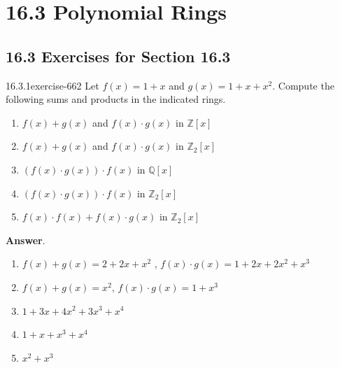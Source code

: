 \documentclass[twoside,10pt,]{book}
\numberwithin{equation}{section}
\begin{document}
\section*{16.3 Polynomial Rings}
\subsection*{16.3 Exercises for Section 16.3}
\begin{divisionsolution}{16.3.1}{}{exercise-662}%
\hypertarget{p-5964}{}%
Let \(f(x) = 1 + x\) and \(g(x) = 1 + x + x^2\). Compute the following sums and products in the indicated rings.\leavevmode%
\begin{enumerate}[label=(\alph*)]
\item\hypertarget{li-2633}{}\hypertarget{p-5965}{}%
\(f(x) + g(x)\) and \(f(x) \cdot  g(x)\) in \(\mathbb{Z}[x]\)%
\item\hypertarget{li-2634}{}\hypertarget{p-5966}{}%
\(f(x) + g(x)\) and \(f(x) \cdot  g(x)\) in \(\mathbb{Z}_2[x]\)%
\item\hypertarget{li-2635}{}\hypertarget{p-5967}{}%
\((f(x)\cdot  g(x))\cdot f(x)\)  in \(\mathbb{Q}[x]\)%
\item\hypertarget{li-2636}{}\hypertarget{p-5968}{}%
\((f(x) \cdot g(x)) \cdot f(x)\) in \(\mathbb{Z}_2[x]\)%
\item\hypertarget{li-2637}{}\hypertarget{p-5969}{}%
\(f(x) \cdot  f(x) + f(x)\cdot  g(x)\) in \(\mathbb{Z}_2[x]\)%
\end{enumerate}
%
\par\smallskip%
\noindent\textbf{Answer}.\quad%
\hypertarget{p-5970}{}%
\leavevmode%
\begin{enumerate}[label=(\alph*)]
\item\hypertarget{li-2638}{}\hypertarget{p-5971}{}%
\(f(x) + g(x) = 2 + 2x + x^2\) ,  \(f(x)\cdot g(x) =1 +2x +2x^2+x^3\)%
\item\hypertarget{li-2639}{}\hypertarget{p-5972}{}%
\(f(x)+g(x)=x^2\),      \(f(x)\cdot g(x) =1+x^3\)%
\item\hypertarget{li-2640}{}\hypertarget{p-5973}{}%
\(1 + 3x + 4x ^2 + 3x^3 + x^4\)%
\item\hypertarget{li-2641}{}\hypertarget{p-5974}{}%
\(1 + x + x^3 + x^4\)%
\item\hypertarget{li-2642}{}\hypertarget{p-5975}{}%
\(x^2+ x^3\)%
\end{enumerate}
%
\end{divisionsolution}%
\end{document}
